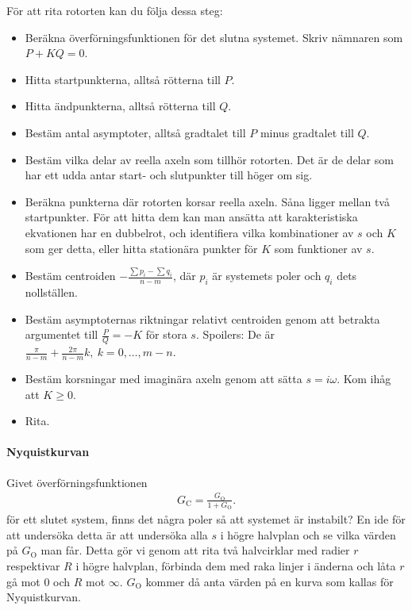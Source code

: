 För att rita rotorten kan du följa dessa steg:
\begin{itemize}
	\item Beräkna överförningsfunktionen för det slutna systemet. Skriv nämnaren som $P + KQ = 0$.
	\item Hitta startpunkterna, alltså rötterna till $P$.
	\item Hitta ändpunkterna, alltså rötterna till $Q$.
	\item Bestäm antal asymptoter, alltså gradtalet till $P$ minus gradtalet till $Q$.
	\item Bestäm vilka delar av reella axeln som tillhör rotorten. Det är de delar som har ett udda antar start- och slutpunkter till höger om sig.
	\item Beräkna punkterna där rotorten korsar reella axeln. Såna ligger mellan två startpunkter. För att hitta dem kan man ansätta att karakteristiska ekvationen har en dubbelrot, och identifiera vilka kombinationer av $s$ och $K$ som ger detta, eller hitta stationära punkter  för $K$ som funktioner av $s$.
	\item Bestäm centroiden $-\frac{\sum p_{i} - \sum q_{i}}{n - m}$, där $p_{i}$ är systemets poler och $q_{i}$ dets nollställen.
	\item Bestäm asymptoternas riktningar relativt centroiden genom att betrakta argumentet till $\frac{P}{Q} = -K$ för stora $s$. Spoilers: De är $\frac{\pi}{n - m} + \frac{2\pi}{n - m}k,\ k = 0, \dots, m - n$.
	\item Bestäm korsningar med imaginära axeln genom att sätta $s = i\omega$. Kom ihåg att $K\geq 0$.
	\item Rita.
\end{itemize}

\paragraph{Nyquistkurvan}
Givet överförningsfunktionen
\begin{align*}
	G_{\text{C}} = \frac{G_{\text{O}}}{1 + G_{\text{O}}}.
\end{align*}
för ett slutet system, finns det några poler så att systemet är instabilt? En ide för att undersöka detta är att undersöka alla $s$ i högre halvplan och se vilka värden på $G_{\text{O}}$ man får. Detta gör vi genom att rita två halvcirklar med radier $r$ respektivar $R$ i högre halvplan, förbinda dem med raka linjer i änderna och låta $r$ gå mot $0$ och $R$ mot $\infty$. $G_{\text{O}}$ kommer då anta värden på en kurva som kallas för Nyquistkurvan.

